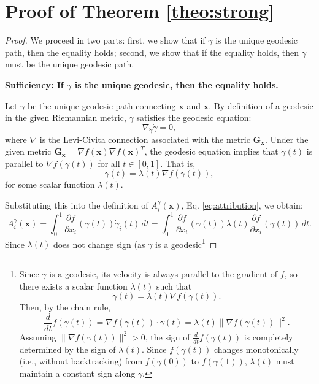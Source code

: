 \section{Proof of Theorem \ref{theo:strong}}
\label{app:proof}

\begin{proof}
	\label{proof:strong}
	We proceed in two parts: first, we show that if \( \gamma \) is the unique geodesic path, then the equality holds; second, we show that if the equality holds, then \( \gamma \) must be the unique geodesic path.
	
	\noindent
	
	\textbf{Sufficiency: If \( \gamma \) is the unique geodesic, then the equality holds.}
	
	Let \( \gamma \) be the unique geodesic path connecting \( \overline{\mathbf{x}} \) and \( \mathbf{x} \). By definition of a geodesic in the given Riemannian metric, \( \gamma \) satisfies the geodesic equation:
	\[
	\nabla_{\dot{\gamma}} \dot{\gamma} = 0,
	\]
	where \( \nabla \) is the Levi-Civita connection associated with the metric \( \mathbf{G}_{\mathbf{x}} \). Under the given metric \( \mathbf{G}_{\mathbf{x}} = \nabla f(\mathbf{x}) \nabla f(\mathbf{x})^T \), the geodesic equation implies that \( \dot{\gamma}(t) \) is parallel to \( \nabla f(\gamma(t)) \) for all \( t \in [0,1] \). That is,
	\[
	\dot{\gamma}(t) = \lambda(t) \nabla f(\gamma(t)),
	\]
	for some scalar function \( \lambda(t) \).
	
	Substituting this into the definition of \( A_i^{\gamma}(\mathbf{x}) \), Eq. \ref{eq:attribution}, we obtain:
	\[
	A_i^{\gamma}(\mathbf{x}) = \int_0^1 \frac{\partial f}{\partial x_i}(\gamma(t)) \dot{\gamma}_i(t) \, dt = \int_0^1 \frac{\partial f}{\partial x_i}(\gamma(t)) \lambda(t) \frac{\partial f}{\partial x_i}(\gamma(t)) \, dt.
	\]
	Since \( \lambda(t) \) does not change sign (as \( \gamma \) is a geodesic\footnote{Since $\gamma$ is a geodesic, its velocity is always parallel to the gradient of $f$, so there exists a scalar function $\lambda(t)$ such that
		\[
		\dot{\gamma}(t) = \lambda(t)\nabla f(\gamma(t)).
		\]
		Then, by the chain rule,
		\[
		\frac{d}{dt} f(\gamma(t)) = \nabla f(\gamma(t))\cdot\dot{\gamma}(t)= \lambda(t)\|\nabla f(\gamma(t))\|^2.
		\]
		Assuming $\|\nabla f(\gamma(t))\|^2>0$, the sign of $\frac{d}{dt} f(\gamma(t))$ is completely determined by the sign of $\lambda(t)$. Since $f(\gamma(t))$ changes monotonically (i.e., without backtracking) from $f(\gamma(0))$ to $f(\gamma(1))$, $\lambda(t)$ must maintain a constant sign along $\gamma$. 
		
}
\end{proof}
